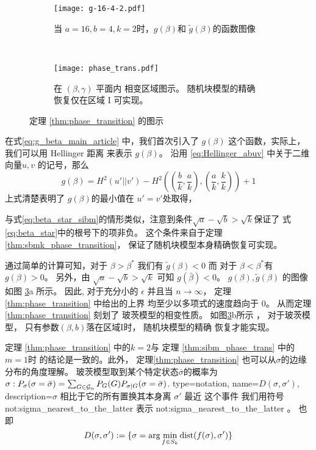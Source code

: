 \begin{figure}[H]
	\begin{subfigure}{0.43\textwidth}
		\texttt{[image: g-16-4-2.pdf]}
		\caption{当 $a=16,b=4,k=2$时，$g(\beta)$和
		$\tilde{g}(\beta)$的函数图像}\label{fig:g}
	\end{subfigure}~
	\begin{subfigure}{0.55\textwidth}
		\texttt{[image: phase\_trans.pdf]}
		\caption{
			在 $(\beta, \gamma)$ 平面内
			相变区域图示。
			随机块模型的精确
			恢复仅在区域 I 可实现。}\label{fig:pt}
	\end{subfigure}
	\caption{定理 \ref{thm:phase_transition}
	的图示}
	\label{fig:phase_transition_theorem_illustration}
\end{figure}
\begin{remark}
	在式\eqref{eq:g_beta_main_article} 中，我们首次引入了
	$g(\beta)$ 这个函数，实际上，我们可以用 Hellinger 距离
	来表示 $g(\beta)$。
	沿用 \eqref{eq:Hellinger_abuv} 中关于二维向量$u,v$
	的记号，那么 
	\begin{equation}
		g(\beta) = H^2(u' || v') - H^2((\frac{b}{k}, \frac{a}{k}), (\frac{a}{k}, \frac{k}{k}))
		+ 1
	\end{equation}
	上式清楚表明了 $g(\beta)$的最小值在 $u'=v'$处取得，

\end{remark}
与式\eqref{eq:beta_star_sibm}的情形类似，注意到条件$\sqrt{a} - \sqrt{b} > \sqrt{k}$保证了
式\eqref{eq:beta_star}中的根号下的项非负。
这个条件来自于定理\ref{thm:sbmk_phase_transition}，
保证了随机块模型本身精确恢复可实现。


通过简单的计算可知，对于 $\beta> \beta^*$ 我们有
$\tilde{g}(\beta) < 0$ 而 对于 $\beta < \beta^*$有
$g(\beta)>0$。
另外，由 $\sqrt{a} - \sqrt{b} > \sqrt{k}$ 可知
$g(\bar{\beta}) < 0$。
$g(\beta), \tilde{g}(\beta)$ 的图像
如图 \ref{fig:phase_transition_theorem_illustration}a 所示。
因此, 对于充分小的
$\epsilon$ 并且当 $n \to \infty$，
定理\ref{thm:phase_transition} 中给出的上界
均至少以多项式的速度趋向于 $0$。
从而定理\ref{thm:phase_transition} 
刻划了
玻茨模型的相变性质。
如图\ref{fig:phase_transition_theorem_illustration}b所示
， 对于玻茨模型， 只有参数$(\beta, b)$落在区域I时，
随机块模型的精确
恢复才能实现。



定理 \ref{thm:phase_transition} 中的$k=2$与
定理 \ref{thm:sibm_phase_trans} 中的$m=1$时
的结论是一致的。此外，
定理\ref{thm:phase_transition}
也可以从$\sigma$的边缘分布的角度理解。
玻茨模型取到某个特定状态$\bar{\sigma}$的概率为
 $\sigma: P_{\sigma}(\sigma =\bar{\sigma})
=\sum_{G \in \mathcal{G}_n}P_G(G)P_{\sigma |G}(\sigma=\bar{\sigma})$.
{
  type=notation,
  name={\ensuremath{D(\sigma, \sigma')}},
  description={$\sigma$ 相比于它的所有置换其本身离 $\sigma'$ 最近
  这个事件}
}
我们用符号 \gls{not:sigma_nearest_to_the_latter} 表示 \glsdesc{not:sigma_nearest_to_the_latter}
。
也即
\begin{equation}
	\label{eq:D_sigma_sigma_prime}
D(\sigma, \sigma') := \{ \sigma = \arg\min_{f \in S_k} \operatorname{dist}(f(\sigma), \sigma')  \}
\end{equation}


